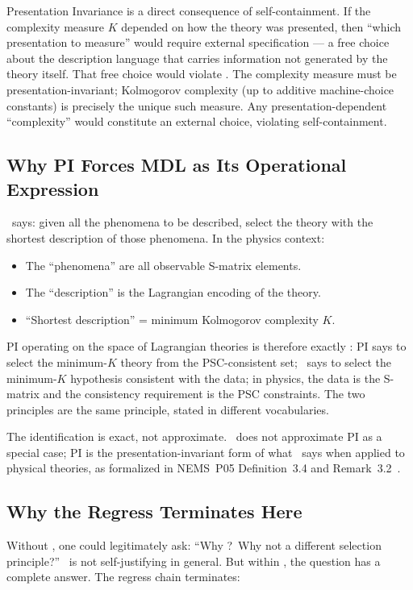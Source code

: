 \documentclass[11pt,openany]{book}
\theoremstyle{remark}
\newcommand{\MDL}{\text{MDL}}
\newcommand{\PSC}{\text{PSC}}
\begin{document}
Presentation Invariance is a direct consequence of self-containment. If the complexity
measure $K$ depended on how the theory was presented, then ``which presentation to
measure'' would require external specification --- a free choice about the description
language that carries information not generated by the theory itself. That free choice
would violate \PSC. The complexity measure must be presentation-invariant; Kolmogorov
complexity (up to additive machine-choice constants) is precisely the unique such
measure. Any presentation-dependent ``complexity'' would constitute an external choice,
violating self-containment.

\subsection*{Why PI Forces MDL as Its Operational Expression}

\MDL\ says: given all the phenomena to be described, select the theory with the
shortest description of those phenomena. In the physics context:
\begin{itemize}[itemsep=2pt]
\item The ``phenomena'' are all observable S-matrix elements.
\item The ``description'' is the Lagrangian encoding of the theory.
\item ``Shortest description'' = minimum Kolmogorov complexity $K$.
\end{itemize}
PI operating on the space of Lagrangian theories is therefore exactly \MDL:
PI says to select the minimum-$K$ theory from the PSC-consistent set;
\MDL\ says to select the minimum-$K$ hypothesis consistent with the data;
in physics, the data is the S-matrix and the consistency requirement is the PSC
constraints. The two principles are the same principle, stated in different vocabularies.

The identification is exact, not approximate. \MDL\ does not approximate PI as a
special case; PI is the presentation-invariant form of what \MDL\ says when applied
to physical theories, as formalized in NEMS~P05 Definition~3.4 and Remark~3.2~\cite{SpivackNEMS05}.

\subsection*{Why the Regress Terminates Here}

Without \PSC, one could legitimately ask: ``Why \MDL?\ Why not a different selection
principle?'' \MDL\ is not self-justifying in general. But within \PSC, the question
has a complete answer. The regress chain terminates:
\end{document}
